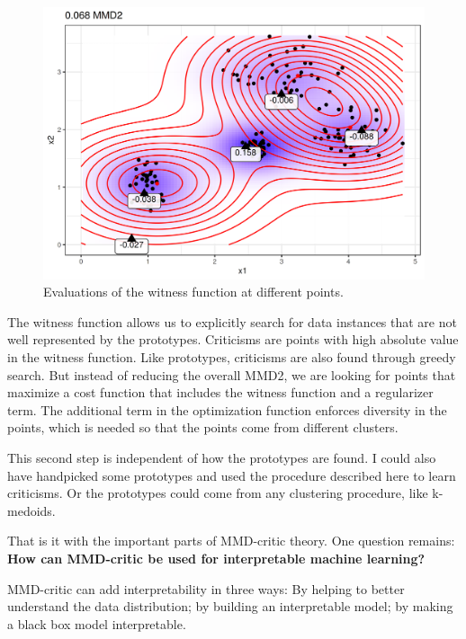 \documentclass[12pt,]{krantz}
\begin{document}
\begin{figure}

{\centering \includegraphics[width=\textwidth]{images/witness-1} 

}

\caption{Evaluations of the witness function at different points.}\label{fig:witness}
\end{figure}

The witness function allows us to explicitly search for data instances
that are not well represented by the prototypes. Criticisms are points
with high absolute value in the witness function. Like prototypes,
criticisms are also found through greedy search. But instead of reducing
the overall MMD2, we are looking for points that maximize a cost
function that includes the witness function and a regularizer term. The
additional term in the optimization function enforces diversity in the
points, which is needed so that the points come from different clusters.

This second step is independent of how the prototypes are found. I could
also have handpicked some prototypes and used the procedure described
here to learn criticisms. Or the prototypes could come from any
clustering procedure, like k-medoids.

That is it with the important parts of MMD-critic theory. One question
remains: \textbf{How can MMD-critic be used for interpretable machine
learning?}

MMD-critic can add interpretability in three ways: By helping to better
understand the data distribution; by building an interpretable model; by
making a black box model interpretable.
\end{document}
